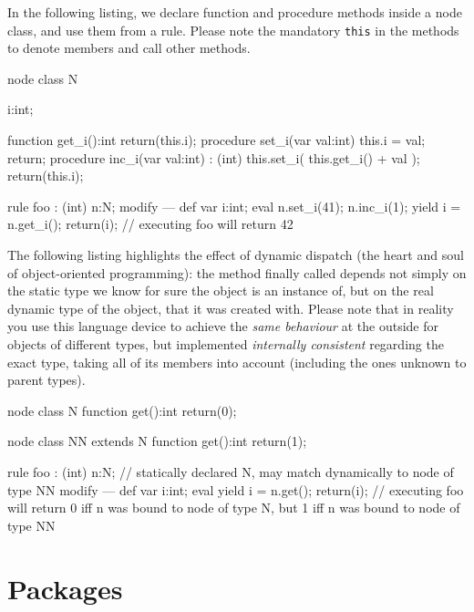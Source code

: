 \begin{example}
In the following listing, we declare function and procedure methods inside a node class, and use them from a rule.
Please note the mandatory \texttt{this} in the methods to denote members and call other methods.
	\begin{grgen}
node class N
{
	i:int;
	
	function get_i():int
	{
		return(this.i);
	}
	procedure set_i(var val:int)
	{
		this.i = val;
		return;
	}
	procedure inc_i(var val:int) : (int)
	{
		this.set_i( this.get_i() + val );
		return(this.i);
	}
}

rule foo : (int)
{
	n:N;
	modify {
	---
		def var i:int;
		eval {
			n.set_i(41);
			n.inc_i(1);
			yield i = n.get_i();
		}
		return(i); // executing foo will return 42
	}
}
	\end{grgen}
\end{example}


\begin{example}
The following listing highlights the effect of dynamic dispatch (the heart and soul of object-oriented programming): 
the method finally called depends not simply on the static type we know for sure the object is an instance of,
but on the real dynamic type of the object, that it was created with.
Please note that in reality you use this language device to achieve the \emph{same behaviour} at the outside for objects of different types, but implemented \emph{internally consistent} regarding the exact type, taking all of its members into account (including the ones unknown to parent types).
	\begin{grgen}
node class N
{	
	function get():int
	{
		return(0);
	}
}

node class NN extends N
{	
	function get():int
	{
		return(1);
	}
}

rule foo : (int)
{
	n:N; // statically declared N, may match dynamically to node of type NN
	modify {
	---
		def var i:int;
		eval {
			yield i = n.get();
		}
		return(i); // executing foo will return 0 iff n was bound to node of type N, but 1 iff n was bound to node of type NN
	}
}
	\end{grgen}
\end{example}


\section{Packages}\label{sec:packages}

